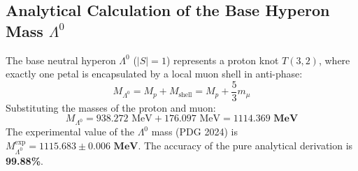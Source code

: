 \documentclass[12pt,a4paper]{article}
\begin{document}
		\subsection{Analytical Calculation of the Base Hyperon Mass $\Lambda^0$}
		The base neutral hyperon $\Lambda^0$ ($|S|=1$) represents a proton knot $T(3,2)$, where exactly one petal is encapsulated by a local muon shell in anti-phase:
		\begin{equation}
			M_{\Lambda^0} = M_p + M_{\text{shell}} = M_p + \frac{5}{3} m_\mu
		\end{equation}
		Substituting the masses of the proton and muon:
		\begin{equation}
			M_{\Lambda^0} = 938.272 \text{ MeV} + 176.097 \text{ MeV} = \mathbf{1114.369 \text{ MeV}}
		\end{equation}
		The experimental value of the $\Lambda^0$ mass (PDG 2024) is $M_{\Lambda^0}^{\text{exp}} = \mathbf{1115.683 \pm 0.006 \text{ MeV}}$. 
		The accuracy of the pure analytical derivation is \textbf{99.88\%}.
		
\end{document}
